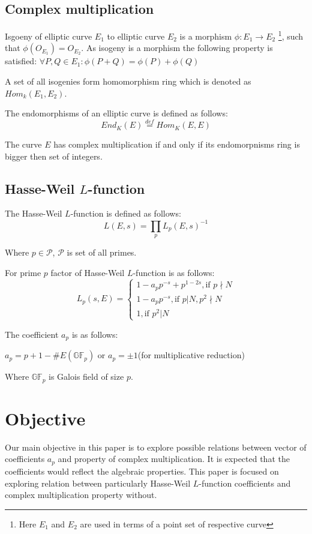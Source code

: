 \documentclass[11pt]{article}
\begin{document}
    \subsection{Complex multiplication}\label{subsec:complexmultiplication}


    Isgoeny of elliptic curve $E_1$ to elliptic curve $E_2$ is a morphism $\phi: E_1\to E_2$
    \footnote{Here $E_1$ and $E_2$ are used in terms of a point set of respective curve}, such that
    $\phi(O_{E_1}) = O_{E_2}$.
    As isogeny is a morphism the following property is satisfied: $\forall P,Q\in E_1:\phi(P+Q)=\phi(P)+\phi(Q)$

    A set of all isogenies form homomorphism ring which is denoted as $Hom_k(E_1, E_2)$.

    The endomorphisms of an elliptic curve is defined as follows:
    \[
        End_K(E) \stackrel{def}{=} Hom_K(E,E)
    \]

    The curve $E$ has complex multiplication if and only if its endomorpnisms ring is bigger then set of integers.

    \subsection{Hasse-Weil $L$-function}\label{subsec:hasseweil_l_function}

    The Hasse-Weil $L$-function is defined as follows:
    \[
        L(E,s) = \prod_p L_p(E,s)^{-1}
    \]

    Where $p\in\mathcal{P}$, $\mathcal{P}$ is set of all primes.

    For prime $p$ factor of Hasse-Weil $L$-function is as follows:
    \[
        L_p(s,E)=
        \begin{cases}
            1-a_pp^{-s}+p^{1-2s}, \text{if } p \nmid N\\
            1-a_pp^{-s}, \text{if } p | N, p^2 \nmid N\\
            1, \text{if }p^2 | N
        \end{cases}
    \]

    The coefficient $a_p$ is as follows:

    $a_p = p+1-\#E(\mathbb{GF}_p)$ or $a_p = \pm 1$(for multiplicative reduction)

    Where $\mathbb{GF}_p$ is Galois field of size $p$.

    \section{Objective}\label{sec:objective}
    Our main objective in this paper is to explore possible relations between vector of coefficients $a_p$ and
    property of complex multiplication.
    It is expected that the coefficients would reflect the algebraic properties.
    This paper is focused on exploring relation between particularly Hasse-Weil $L$-function coefficients and complex
    multiplication property without.
\end{document}
